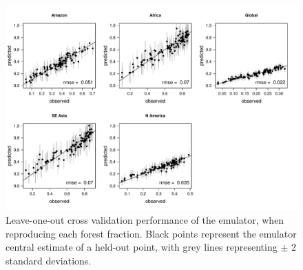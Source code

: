 \documentclass[esd, manuscript]{copernicus} %
\begin{document}
\begin{figure}[t]
\includegraphics[width=12cm]{graphics/frac_loo.pdf}
\caption{Leave-one-out cross validation performance of the emulator, when reproducing each forest fraction. Black points represent the emulator central estimate of a held-out point, with grey lines representing $\pm$ 2 standard deviations.}
\label{fig:frac_loo}
\end{figure}
\end{document}
